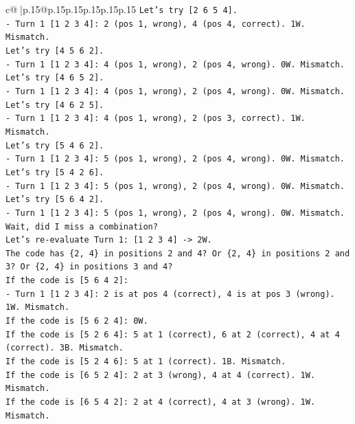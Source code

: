 \documentclass{article}
\begin{document}
{\begin{supertabular}{c@{$\;$}|p{.15\linewidth}@{}p{.15\linewidth}p{.15\linewidth}p{.15\linewidth}p{.15\linewidth}p{.15\linewidth}}
{{{\texttt{Let's try {[}2 6 5 4{]}.} \\
\texttt{{-} Turn 1 {[}1 2 3 4{]}: 2 (pos 1, wrong), 4 (pos 4, correct). 1W. Mismatch.} \\
\texttt{Let's try {[}4 5 6 2{]}.} \\
\texttt{{-} Turn 1 {[}1 2 3 4{]}: 4 (pos 1, wrong), 2 (pos 4, wrong). 0W. Mismatch.} \\
\texttt{Let's try {[}4 6 5 2{]}.} \\
\texttt{{-} Turn 1 {[}1 2 3 4{]}: 4 (pos 1, wrong), 2 (pos 4, wrong). 0W. Mismatch.} \\
\texttt{Let's try {[}4 6 2 5{]}.} \\
\texttt{{-} Turn 1 {[}1 2 3 4{]}: 4 (pos 1, wrong), 2 (pos 3, correct). 1W. Mismatch.} \\
\texttt{Let's try {[}5 4 6 2{]}.} \\
\texttt{{-} Turn 1 {[}1 2 3 4{]}: 5 (pos 1, wrong), 2 (pos 4, wrong). 0W. Mismatch.} \\
\texttt{Let's try {[}5 4 2 6{]}.} \\
\texttt{{-} Turn 1 {[}1 2 3 4{]}: 5 (pos 1, wrong), 2 (pos 4, wrong). 0W. Mismatch.} \\
\texttt{Let's try {[}5 6 4 2{]}.} \\
\texttt{{-} Turn 1 {[}1 2 3 4{]}: 5 (pos 1, wrong), 2 (pos 4, wrong). 0W. Mismatch.} \\
\texttt{Wait, did I miss a combination?} \\
\texttt{Let's re{-}evaluate Turn 1: {[}1 2 3 4{]} {-}> 2W.} \\
\texttt{The code has \{2, 4\} in positions 2 and 4? Or \{2, 4\} in positions 2 and 3? Or \{2, 4\} in positions 3 and 4?} \\
\texttt{If the code is {[}5 6 4 2{]}:} \\
\texttt{{-} Turn 1 {[}1 2 3 4{]}: 2 is at pos 4 (correct), 4 is at pos 3 (wrong). 1W. Mismatch.} \\
\texttt{If the code is {[}5 6 2 4{]}: 0W.} \\
\texttt{If the code is {[}5 2 6 4{]}: 5 at 1 (correct), 6 at 2 (correct), 4 at 4 (correct). 3B. Mismatch.} \\
\texttt{If the code is {[}5 2 4 6{]}: 5 at 1 (correct). 1B. Mismatch.} \\
\texttt{If the code is {[}6 5 2 4{]}: 2 at 3 (wrong), 4 at 4 (correct). 1W. Mismatch.} \\
\texttt{If the code is {[}6 5 4 2{]}: 2 at 4 (correct), 4 at 3 (wrong). 1W. Mismatch.} \\
}}}
\end{supertabular}}
\end{document}
